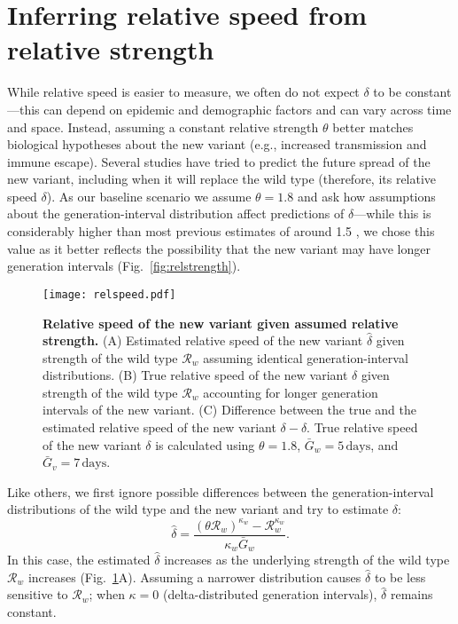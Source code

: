 \documentclass[12pt]{article}
\newcommand{\fref}[1]{Fig.~\ref{fig:#1}}
\newcommand{\RR}{\ensuremath{{\mathcal R}}\xspace}
\begin{document}
\section{Inferring relative speed from relative strength}

While relative speed is easier to measure, we often do not expect $\delta$ to be constant---this can depend on epidemic and demographic factors and can vary across time and space.
Instead, assuming a constant relative strength $\theta$ better matches biological hypotheses about the new variant (e.g., increased transmission and immune escape).
Several studies have tried to predict the future spread of the new variant, including when it will replace the wild type (therefore, its relative speed $\delta$).
As our baseline scenario we assume $\theta = 1.8$ and ask how assumptions about the generation-interval distribution affect predictions of $\delta$---while this is considerably higher than most previous estimates of around 1.5 \citep{switzerland2021variant, davies2021estimated, di2021impact, leung2021early, volz2021transmission,zhao2021}, we chose this value as it better reflects the possibility that the new variant may have longer generation intervals (\fref{relstrength}).

\begin{figure}[!th]
\texttt{[image: relspeed.pdf]}
\caption{
\textbf{Relative speed of the new variant given assumed relative strength.}
(A) Estimated relative speed of the new variant $\hat{\delta}$ given strength of the wild type $\RR_w$ assuming identical generation-interval distributions.
(B) True relative speed of the new variant $\delta$ given strength of the wild type $\RR_w$ accounting for longer generation intervals of the new variant.
(C) Difference between the true and the estimated relative speed of the new variant $\delta - \hat{\delta}$.
True relative speed of the new variant $\delta$ is calculated using $\theta=1.8$, $\bar{G}_w = 5\,\textrm{days}$, and $\bar{G}_v = 7\,\textrm{days}$.
}
\label{fig:relspeed}
\end{figure}

Like others, we first ignore possible differences between the generation-interval distributions of the wild type and the new variant and try to estimate $\delta$:
\begin{equation}
\hat{\delta} = \frac{(\theta \RR_w)^{\kappa_w} - \RR_w^{\kappa_w}}{\kappa_w \bar{G}_w}.
\end{equation}
In this case, the estimated $\hat{\delta}$ increases as the underlying strength of the wild type $\RR_w$ increases (\fref{relspeed}A).
Assuming a narrower distribution causes $\hat{\delta}$ to be less sensitive to $\RR_w$;
when $\kappa = 0$ (delta-distributed generation intervals), $\hat{\delta}$ remains constant.
\end{document}
